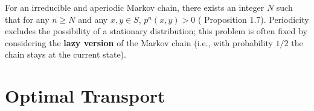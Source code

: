 \documentclass[openany]{book}
\theoremstyle{definition}
\newtheorem{definition}{Definition}[chapter]
\theoremstyle{remark}
\begin{document}
For an irreducible and aperiodic Markov chain, there exists an integer $N$ such that for any $n\ge N$ and any $x,y\in S$, $p^n(x,y)>0$ (\cite{LP17} Proposition 1.7). Periodicity excludes the possibility of a stationary distribution; this problem is often fixed by considering the \textbf{lazy version} of the Markov chain (i.e., with probability $1/2$ the chain stays at the current state).

\part{Optimal Transport}

\begin{comment}
\part{Markov Chains}
\chapter{Discrete-Time Markov Chains}
\section{Basic Concepts}
For discrete-time Markov chains, the state space is assumed to be countable, and thus is denoted by $I$.
\begin{definition}
    A stochastic process $(X_t)_{t\ge0}$ is a \textbf{Markov chain} with \textbf{initial distribution} $\lambda$ and \textbf{transition matrix} $P$, or is $\mathrm{Markov}(\lambda,P)$, if
    \begin{itemize}
        \item $X_0$ has distribution $\lambda$;
        \item For any $t\ge0$, conditioned on $X_t=i$, $X_{t+1}$ has distribution $(p_{ij})_{j\in I}$ and is independent of $X_0,\ldots,X_{t-1}$.
    \end{itemize}
\end{definition}

We use $\mathrm{Pr}_i(A)$ to denote $\mathrm{Pr}(A|X_0=i)$. We say that $i$ leads to $j$, denoted by $i\rightarrow j$, if
\begin{equation}
    \mathrm{Pr}_i(X_t=j\textrm{ for some }t\ge0)>0.
\end{equation}
We say $i$ communicates with $j$, denoted by $i\leftrightarrow j$, if $i\rightarrow j$ and $j\rightarrow i$. $\leftrightarrow$ is a equivalence relation on $I$, and partitions $I$ into \textbf{communicating classes}. A chain or transition matrix $P$ is \textbf{irreducible} if $I$ is a single class. Furthermore, a class is \textbf{closed} if for any $i\in C$ and $j \leftarrow i$, we have $j\in C$. A state $i$ is \textbf{absorbing} if $\{i\}$ is a closed class.


\end{comment}
\end{document}
